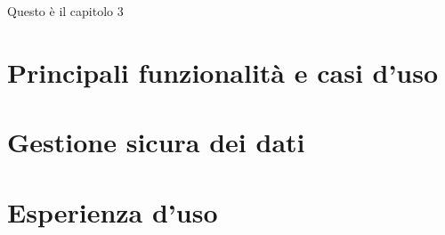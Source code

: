 Questo è il capitolo 3
\section{Principali funzionalità e casi d'uso}
\section{Gestione sicura dei dati}
\section{Esperienza d'uso}

